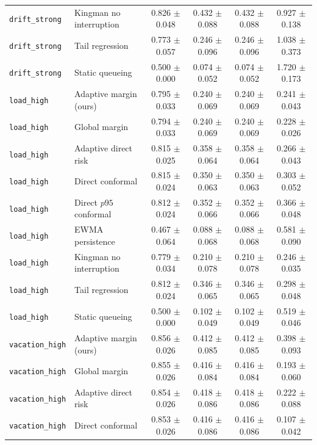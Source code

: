 \begin{tabular}{llcccc}
\texttt{drift\_strong} & Kingman no interruption & 0.826 $\pm$ 0.048 & 0.432 $\pm$ 0.088 & 0.432 $\pm$ 0.088 & 0.927 $\pm$ 0.138 \\
\texttt{drift\_strong} & Tail regression & 0.773 $\pm$ 0.057 & 0.246 $\pm$ 0.096 & 0.246 $\pm$ 0.096 & 1.038 $\pm$ 0.373 \\
\texttt{drift\_strong} & Static queueing & 0.500 $\pm$ 0.000 & 0.074 $\pm$ 0.052 & 0.074 $\pm$ 0.052 & 1.720 $\pm$ 0.173 \\
\hline
\texttt{load\_high} & Adaptive margin (ours) & 0.795 $\pm$ 0.033 & 0.240 $\pm$ 0.069 & 0.240 $\pm$ 0.069 & 0.241 $\pm$ 0.043 \\
\texttt{load\_high} & Global margin & 0.794 $\pm$ 0.033 & 0.240 $\pm$ 0.069 & 0.240 $\pm$ 0.069 & 0.228 $\pm$ 0.026 \\
\texttt{load\_high} & Adaptive direct risk & 0.815 $\pm$ 0.025 & 0.358 $\pm$ 0.064 & 0.358 $\pm$ 0.064 & 0.266 $\pm$ 0.043 \\
\texttt{load\_high} & Direct conformal & 0.815 $\pm$ 0.024 & 0.350 $\pm$ 0.063 & 0.350 $\pm$ 0.063 & 0.303 $\pm$ 0.052 \\
\texttt{load\_high} & Direct $p95$ conformal & 0.812 $\pm$ 0.024 & 0.352 $\pm$ 0.066 & 0.352 $\pm$ 0.066 & 0.366 $\pm$ 0.048 \\
\texttt{load\_high} & EWMA persistence & 0.467 $\pm$ 0.064 & 0.088 $\pm$ 0.068 & 0.088 $\pm$ 0.068 & 0.581 $\pm$ 0.090 \\
\texttt{load\_high} & Kingman no interruption & 0.779 $\pm$ 0.034 & 0.210 $\pm$ 0.078 & 0.210 $\pm$ 0.078 & 0.246 $\pm$ 0.035 \\
\texttt{load\_high} & Tail regression & 0.812 $\pm$ 0.024 & 0.346 $\pm$ 0.065 & 0.346 $\pm$ 0.065 & 0.298 $\pm$ 0.048 \\
\texttt{load\_high} & Static queueing & 0.500 $\pm$ 0.000 & 0.102 $\pm$ 0.049 & 0.102 $\pm$ 0.049 & 0.519 $\pm$ 0.046 \\
\hline
\texttt{vacation\_high} & Adaptive margin (ours) & 0.856 $\pm$ 0.026 & 0.412 $\pm$ 0.085 & 0.412 $\pm$ 0.085 & 0.398 $\pm$ 0.093 \\
\texttt{vacation\_high} & Global margin & 0.855 $\pm$ 0.026 & 0.416 $\pm$ 0.084 & 0.416 $\pm$ 0.084 & 0.193 $\pm$ 0.060 \\
\texttt{vacation\_high} & Adaptive direct risk & 0.854 $\pm$ 0.026 & 0.418 $\pm$ 0.086 & 0.418 $\pm$ 0.086 & 0.222 $\pm$ 0.088 \\
\texttt{vacation\_high} & Direct conformal & 0.853 $\pm$ 0.026 & 0.416 $\pm$ 0.086 & 0.416 $\pm$ 0.086 & 0.107 $\pm$ 0.042 \\

\end{tabular}
